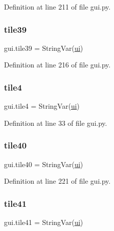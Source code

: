 Definition at line 211 of file gui.\+py.

\mbox{\label{namespacegui_ac73444c8a69cc21b256a72290397a012}} 
\subsubsection{\texorpdfstring{tile39}{tile39}}
{\footnotesize\ttfamily gui.\+tile39 = String\+Var(\mbox{\hyperlink{namespacegui_a40ab7281456eadbea2dc2038f5c24fa1}{ui}})}



Definition at line 216 of file gui.\+py.

\mbox{\label{namespacegui_ad05cf08ea2bd8331ecd579ff357ba470}} 
\subsubsection{\texorpdfstring{tile4}{tile4}}
{\footnotesize\ttfamily gui.\+tile4 = String\+Var(\mbox{\hyperlink{namespacegui_a40ab7281456eadbea2dc2038f5c24fa1}{ui}})}



Definition at line 33 of file gui.\+py.

\mbox{\label{namespacegui_abecd47cdd67a62874fe67c1538ecaddd}} 
\subsubsection{\texorpdfstring{tile40}{tile40}}
{\footnotesize\ttfamily gui.\+tile40 = String\+Var(\mbox{\hyperlink{namespacegui_a40ab7281456eadbea2dc2038f5c24fa1}{ui}})}



Definition at line 221 of file gui.\+py.

\mbox{\label{namespacegui_a70488256d9402586c324ab9d2aa29c16}} 
\subsubsection{\texorpdfstring{tile41}{tile41}}
{\footnotesize\ttfamily gui.\+tile41 = String\+Var(\mbox{\hyperlink{namespacegui_a40ab7281456eadbea2dc2038f5c24fa1}{ui}})}




